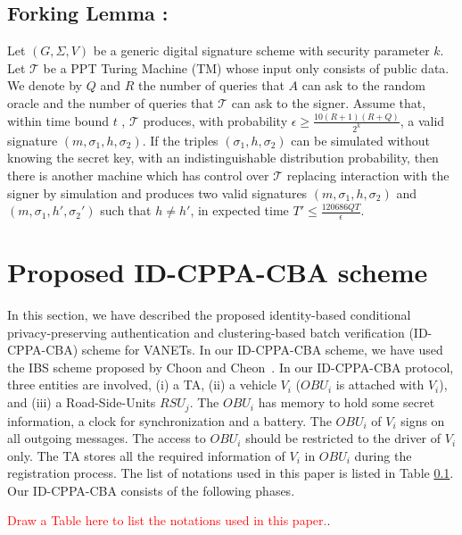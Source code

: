 \documentclass[10pt,journal,letterpaper]{IEEEtran}
\begin{document}
\subsection{Forking Lemma \cite{r12}:}
Let $(G, \Sigma, V)$ be a generic digital signature scheme with
security parameter $k$. Let $\mathcal{T}$ be a PPT Turing Machine
(TM) whose input only consists of public data. We denote by $Q$ and
$R$ the number of queries that $A$ can ask to the random oracle and
the number of queries that $\mathcal{T}$ can ask to the signer.
Assume that, within time bound $t$ , $\mathcal{T}$ produces, with
probability $\epsilon\geq\frac{10(R+1)(R+Q)}{2^k}$, a valid
signature $(m, \sigma_1, h, \sigma_2)$. If the triples $(\sigma_1,
h, \sigma_2)$ can be simulated without knowing the secret key, with
an indistinguishable distribution probability, then there is another
machine which has control over $\mathcal{T}$ replacing interaction
with the signer by simulation and produces two valid signatures $(m,
\sigma_1, h, \sigma_2)$ and $(m, \sigma_1, h', \sigma_2')$ such that
$h \neq h'$, in expected time $T'\leq\frac{120686QT}{\epsilon}$.

\section{Proposed ID-CPPA-CBA scheme}
\label{L4}In this section, we have described the proposed
identity-based conditional privacy-preserving authentication and
clustering-based batch verification (ID-CPPA-CBA) scheme for VANETs.
In our ID-CPPA-CBA scheme, we have used the IBS scheme proposed by
Choon and Cheon~\cite{Jcc2003}. In our ID-CPPA-CBA protocol, three
entities are involved, (i) a TA, (ii) a vehicle $V_{i}$ ($OBU_{i}$
is attached with $V_{i}$), and (iii) a Road-Side-Units $RSU_{j}$.
The $OBU_{i}$ has memory to hold some secret information, a clock
for synchronization and a battery. The $OBU_{i}$ of $V_{i}$ signs on
all outgoing messages. The access to $OBU_{i}$ should be restricted
to the driver of $V_{i}$ only. The TA stores all the required
information of $V_{i}$ in $OBU_{i}$ during the registration process.
The list of notations used in this paper is listed in Table \ref{}.
Our ID-CPPA-CBA consists of the following phases.

\textcolor{red}{Draw a Table here to list the notations used in this
paper.}.
\end{document}
